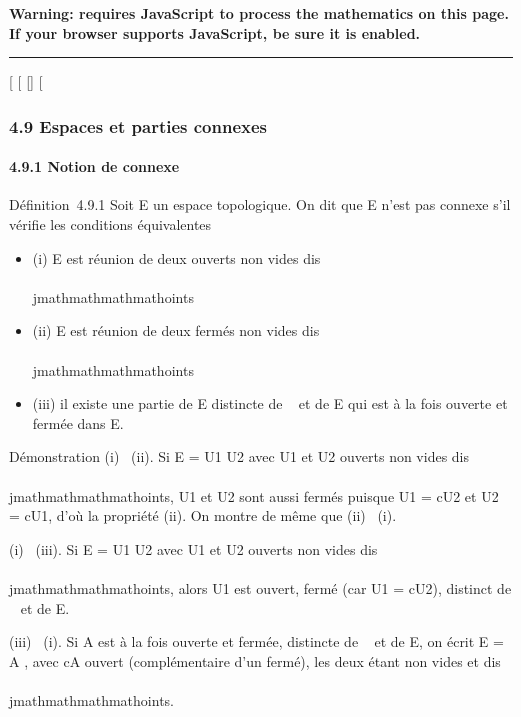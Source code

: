 \textbf{Warning: 
requires JavaScript to process the mathematics on this page.\\ If your
browser supports JavaScript, be sure it is enabled.}

\begin{center}\rule{3in}{0.4pt}\end{center}

{[}
{[}
{[}{]}
{[}

\subsubsection{4.9 Espaces et parties connexes}

\paragraph{4.9.1 Notion de connexe}

Définition~4.9.1 Soit E un espace topologique. On dit que E n'est pas
connexe s'il vérifie les conditions équivalentes

\begin{itemize}
\itemsep1pt\parskip0pt
\item
  (i) E est réunion de deux ouverts non vides dis\\\\jmathmathmathmathoints
\item
  (ii) E est réunion de deux fermés non vides dis\\\\jmathmathmathmathoints
\item
  (iii) il existe une partie de E distincte de \varnothing~ et de E qui est à la
  fois ouverte et fermée dans E.
\end{itemize}

Démonstration (i) \rigtharrow~(ii). Si E = U1 \cup U2 avec
U1 et U2 ouverts non vides dis\\\\jmathmathmathmathoints, U1
et U2 sont aussi fermés puisque U1 = cU2
et U2 = cU1, d'où la propriété (ii). On montre de
même que (ii) \rigtharrow~(i).

(i) \rigtharrow~(iii). Si E = U1 \cup U2 avec U1 et
U2 ouverts non vides dis\\\\jmathmathmathmathoints, alors U1 est ouvert,
fermé (car U1 = cU2), distinct de \varnothing~ et de E.

(iii) \rigtharrow~(i). Si A est à la fois ouverte et fermée, distincte de \varnothing~ et de
E, on écrit E = A \cupcA, avec cA ouvert (complémentaire d'un fermé), les
deux étant non vides et dis\\\\jmathmathmathmathoints.


